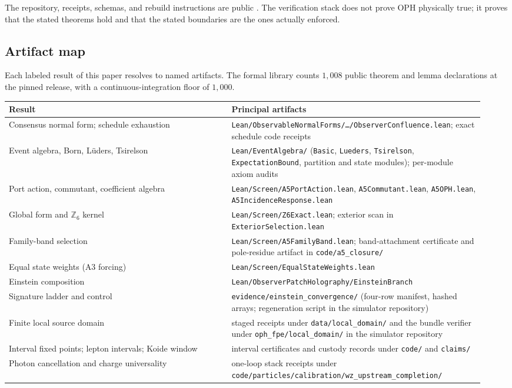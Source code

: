 \documentclass[11pt]{article}
\theoremstyle{remark}
\begin{document}
The repository, receipts, schemas, and rebuild instructions are public
\cite{ophrepo,ophsim}. The verification stack does not prove OPH physically
true; it proves that the stated theorems hold and that the stated boundaries
are the ones actually enforced.

\subsection{Artifact map}

Each labeled result of this paper resolves to named artifacts. The formal
library counts $1{,}008$ public theorem and lemma declarations at the pinned
release, with a continuous-integration floor of $1{,}000$.

\begin{center}
\small
\begin{tabular}{@{}L{0.44\linewidth}L{0.50\linewidth}@{}}
\toprule
\textbf{Result} & \textbf{Principal artifacts}\\
\midrule
Consensus normal form; schedule exhaustion
 & \texttt{Lean/ObservableNormalForms/\ldots/ObserverConfluence.lean};
   exact schedule code receipts\\
Event algebra, Born, L\"uders, Tsirelson
 & \texttt{Lean/EventAlgebra/} (\texttt{Basic}, \texttt{Lueders},
   \texttt{Tsirelson}, \texttt{ExpectationBound}, partition and state
   modules); per-module axiom audits\\
Port action, commutant, coefficient algebra
 & \texttt{Lean/Screen/A5PortAction.lean},
   \texttt{A5Commutant.lean}, \texttt{A5OPH.lean},
   \texttt{A5IncidenceResponse.lean}\\
Global form and $\mathbb Z_{6}$ kernel
 & \texttt{Lean/Screen/Z6Exact.lean}; exterior scan in
   \texttt{ExteriorSelection.lean}\\
Family-band selection
 & \texttt{Lean/Screen/A5FamilyBand.lean}; band-attachment certificate and
   pole-residue artifact in \texttt{code/a5\_closure/}\\
Equal state weights (A3 forcing)
 & \texttt{Lean/Screen/EqualStateWeights.lean}\\
Einstein composition
 & \texttt{Lean/ObserverPatchHolography/EinsteinBranch}\\
Signature ladder and control
 & \texttt{evidence/einstein\_convergence/} (four-row manifest, hashed
   arrays; regeneration script in the simulator repository)\\
Finite local source domain
 & staged receipts under \texttt{data/local\_domain/} and the bundle
   verifier under \texttt{oph\_fpe/local\_domain/} in the simulator
   repository\\
Interval fixed points; lepton intervals; Koide window
 & interval certificates and custody records under \texttt{code/} and
   \texttt{claims/} \cite{ophregister}\\
Photon cancellation and charge universality
 & one-loop stack receipts under
   \texttt{code/particles/calibration/wz\_upstream\_completion/}\\
\bottomrule
\end{tabular}
\end{center}
\end{document}
